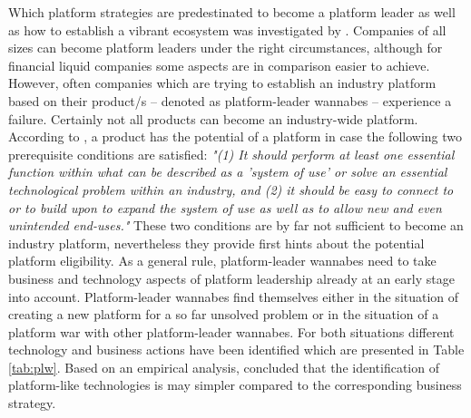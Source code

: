 Which platform strategies are predestinated to become a platform leader as well as how to establish a vibrant ecosystem was investigated by \citet{Gawer2008}. Companies of all sizes can become platform leaders under the right circumstances, although for financial liquid companies some aspects are in comparison easier to achieve. However, often companies which are trying to establish an industry platform based on their product/s -- denoted as platform-leader wannabes -- experience a failure. Certainly not all products can become an industry-wide platform. According to \citet[p. 29]{Gawer2008}, a product has the potential of a platform in case the following two prerequisite conditions are satisfied: \textit{"(1) It should perform at least one essential function within what can be described as a 'system of use' or solve an essential technological problem within an industry, and (2) it should be easy to connect to or to build upon to expand the system of use as well as to allow new and even unintended end-uses."} These two conditions are by far not sufficient to become an industry platform, nevertheless they provide first hints about the potential platform eligibility. As a general rule, platform-leader wannabes need to take business and technology aspects of platform leadership already at an early stage into account. Platform-leader wannabes find themselves either in the situation of creating a new platform for a so far unsolved problem or in the situation of a platform war with other platform-leader wannabes. For both situations different technology and business actions have been identified which are presented in Table \ref{tab:plw}. Based on an empirical analysis, \citet{Gawer2008} concluded that the identification of platform-like technologies is may simpler compared to the corresponding business strategy.

